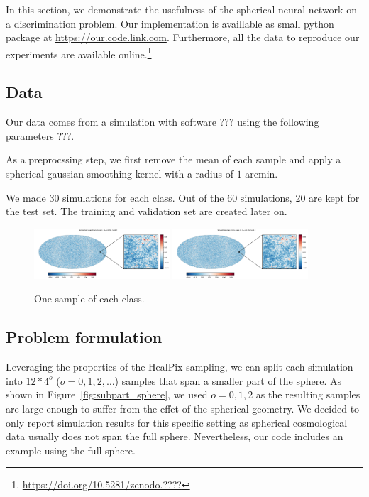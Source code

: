 \documentclass[final,twocolumn,3p,times,authoryear]{elsarticle}
\newcommand{\todo}[1]{{\color[rgb]{.6,.1,.6}{#1}}}
\newcommand{\assign}[1]{{\color[rgb]{.8,.5,.8}{Assigned: #1 }}}
\newcommand{\1}{\b{1}}              %
\newcommand{\0}{\b{0}}              %
\begin{document}
In this section, we demonstrate the usefulness of the spherical neural network
on a discrimination problem. Our implementation is availlable as small python package at \url{https://our.code.link.com}. 
Furthermore, all the data to reproduce our experiments are available online.\footnote{\url{https://doi.org/10.5281/zenodo.????} \todo{correct DOI}}

\subsection{Data}
\assign{Tomek}

Our data comes from a simulation with software ??? using the following parameters ???. 

As a preprocssing step, we first remove the mean of each sample and apply a
spherical gaussian smoothing kernel with a radius of $1$ arcmin.

We made 30 simulations for each class. Out of the 60 simulations, 20 are kept
for the test set. The training and validation set are created later on.

\begin{figure}[!ht]
\centering
\includegraphics[width=0.45\textwidth]{figures/smooth_map_class_1.pdf}
\includegraphics[width=0.45\textwidth]{figures/smooth_map_class_2.pdf}
\caption{One sample of each class.}
\label{fig:map_sample}
\end{figure}

\subsection{Problem formulation}

Leveraging the properties of the HealPix sampling, we can split each simulation
into $12*4^o$ ($o=0,1,2,\dots$) samples that span a smaller part of the sphere.
As shown in Figure~\ref{fig:subpart_sphere}, we used $o=0,1,2$ as the resulting
samples are large enough to suffer from the effet of the spherical geometry. We
decided to only report simulation results for this specific setting as spherical
cosmological data usually does not span the full sphere. Nevertheless, our code
includes an example using the full sphere.
\end{document}
